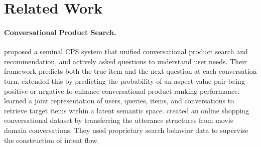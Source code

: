 \section{Related Work} \label{sec:related_work}

\vspace{-0.5em}
\paragraph{Conversational Product Search.}

\citet{zhang2018towards} proposed a seminal CPS system that unified conversational product search and recommendation, and actively asked questions to understand user needs. 
Their framework predicts both the true item and the next question at each conversation turn. 
\citet{bi2019conversational} extended this by predicting the probability of an aspect-value pair being positive or negative to enhance conversational product ranking performance. 
\citet{zou2022learning} learned a joint representation of users, queries, items, and conversations to retrieve target items within a latent semantic space. 
\citet{xiao-etal-2021-end} created an online shopping conversational dataset by transferring the utterance structures from movie domain conversations. They used proprietary search behavior data to supervise the construction of intent flow.%


